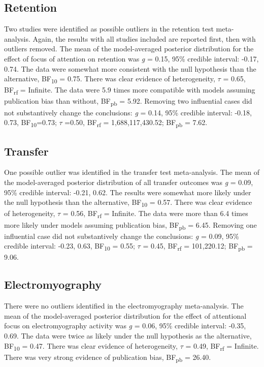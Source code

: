 \documentclass[
  11pt,
  doc, donotrepeattitle,floatsintext]{apa7}
\begin{document}
\hypertarget{retention}{%
\subsection{Retention}\label{retention}}

Two studies were identified as possible outliers in the retention test meta-analysis. Again, the results with all studies included are reported first, then with outliers removed. The mean of the model-averaged posterior distribution for the effect of focus of attention on retention was \emph{g} = 0.15, 95\% credible interval: -0.17, 0.74. The data were somewhat more consistent with the null hypothesis than the alternative, BF\textsubscript{10} = 0.75. There was clear evidence of heterogeneity, \(\tau\) = 0.65, BF\textsubscript{rf} = Infinite. The data were 5.9 times more compatible with models assuming publication bias than without, BF\textsubscript{pb} = 5.92. Removing two influential cases did not substantively change the conclusions: \emph{g} = 0.14, 95\% credible interval: -0.18, 0.73, BF\textsubscript{10}=0.73; \(\tau\) =0.50, BF\textsubscript{rf} = 1,688,117,430.52; BF\textsubscript{pb} = 7.62.

\hypertarget{transfer}{%
\subsection{Transfer}\label{transfer}}

One possible outlier was identified in the transfer test meta-analysis. The mean of the model-averaged posterior distribution of all transfer outcomes was \emph{g} = 0.09, 95\% credible interval: -0.21, 0.62. The results were somewhat more likely under the null hypothesis than the alternative, BF\textsubscript{10} = 0.57. There was clear evidence of heterogeneity, \(\tau\) = 0.56, BF\textsubscript{rf} = Infinite. The data were more than 6.4 times more likely under models assuming publication bias, BF\textsubscript{pb} = 6.45. Removing one influential case did not substantively change the conclusions: \emph{g} = 0.09, 95\% credible interval: -0.23, 0.63, BF\textsubscript{10} = 0.55; \(\tau\) = 0.45, BF\textsubscript{rf} = 101,220.12; BF\textsubscript{pb} = 9.06.

\hypertarget{electromyography}{%
\subsection{Electromyography}\label{electromyography}}

There were no outliers identified in the electromyography meta-analysis. The mean of the model-averaged posterior distribution for the effect of attentional focus on electromyography activity was \emph{g} = 0.06, 95\% credible interval: -0.35, 0.69. The data were twice as likely under the null hypothesis as the alternative, BF\textsubscript{10} = 0.47. There was clear evidence of heterogeneity, \(\tau\) = 0.49, BF\textsubscript{rf} = Infinite. There was very strong evidence of publication bias, BF\textsubscript{pb} = 26.40.
\end{document}
